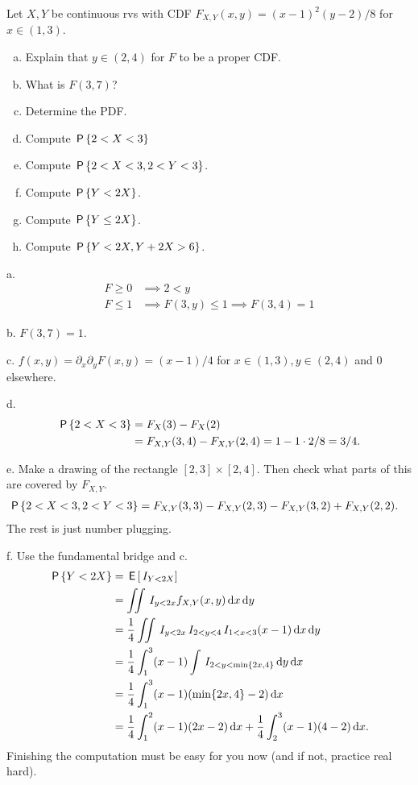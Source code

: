 \begin{exercise}
Let $X, Y$ be continuous rvs with CDF $F_{X,Y}(x,y) = (x-1)^{2}(y-2)/8$ for $x \in (1, 3)$.
\begin{enumerate}[a.]
\item Explain that $y\in (2,4)$ for  $F$ to be a proper CDF.
\item What is $F(3,7)$?
\item Determine the PDF.
\item Compute $\P{2< X < 3}$
\item Compute $\P{2< X < 3, 2<Y<3}$.
\item Compute $\P{Y< 2X}$.
\item Compute $\P{Y\leq  2X}$.
\item Compute $\P{Y< 2X, Y+2X > 6}$.
\end{enumerate}
\begin{solution}
a.
\begin{align}
\label{eq:11}
F \geq 0 &\implies 2<y\\
F \leq 1 &\implies F(3, y)\leq 1 \implies F(3,4)=1
\end{align}

b. $F(3,7) = 1$.

c. $f(x,y) = \partial_{x} \partial_{y} F(x,y) = (x-1)/4$ for $x\in(1,3), y\in(2,4)$ and $0$ elsewhere.

d.
\begin{align}
\P{2 < X < 3}
&= F_{X}(3) - F_{X}(2) \\
&= F_{X,Y}(3, 4) - F_{X,Y}(2,4) = 1 - 1\cdot 2/8 = 3/4.
\end{align}

e.
Make a drawing of the rectangle $[2,3]\times[2,4]$. Then check what parts of this are covered by $F_{X,Y}$.
\begin{align}
\P{2 < X < 3, 2 < Y < 3}
&= F_{X,Y}(3, 3) - F_{X,Y}(2,3)  - F_{X,Y}(3, 2) + F_{X,Y}(2,2).
\end{align}
The rest is just number plugging.


f.
Use the fundamental bridge and c.
\begin{align}
\P{Y< 2 X}
&= \E{\1{Y < 2 X}} \\
&= \iint \1{y < 2 x} f_{X,Y}(x,y) \d x \d y\\
&= \frac{1}{4}\iint \1{y < 2 x} \1{2< y <4} \1{1<x<3} (x-1) \d x \d y\\
&= \frac{1}{4}\int_{1}^{3} (x-1) \int \1{2<y < \min\{2 x,4\}}  \d y \d x \\
&= \frac{1}{4}\int_{1}^{3} (x-1) (\min\{2 x,4\}-2) \d x \\
&= \frac{1}{4}\int_{1}^{2} (x-1) (2 x-2) \d x
+ \frac{1}{4}\int_{2}^{3} (x-1) (4-2) \d x.
\end{align}
Finishing the computation must be easy for you now (and if not, practice real hard).


\end{solution}
\end{exercise}
